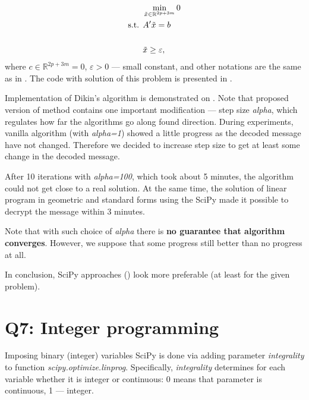 \documentclass{article}
\def\R{\mathbb{R}}
\def\xt{\tilde{x}}
\begin{document}
\begin{equation}\label{eq:dikin_init}
  \begin{aligned}
                 & \min\limits_{\xt \in \R^{2p+3m}} 0 \\
    \text{s.t. } & A' \tilde{x} = b                   \\
    \vspace{20pt}                                     \\
                 & \xt \geq \varepsilon,
  \end{aligned}
  \vspace{20pt}
\end{equation}
where $c \in \mathbb{R}^{2p+3m} = 0 $,
$\varepsilon > 0$ --- small constant,
and other notations are the same as in . The code with solution of this problem is presented in .

Implementation of Dikin's algorithm is demonstrated on . Note that proposed version of method contains one important modification --- step size \textit{alpha}, which regulates how far the algorithms go along found direction.
During experiments, vanilla algorithm (with \textit{alpha=1}) showed a little progress as the decoded message have not changed. Therefore we decided to increase step size to get at least some change in the decoded message.

After 10 iterations with \textit{alpha=100}, which took about 5 minutes, the algorithm could not get close to a real solution. At the same time, the solution of linear program in geometric and standard forms using the SciPy made it possible to decrypt the message within 3 minutes.

Note that with such choice of \textit{alpha} there is \textbf{no guarantee that algorithm converges}. However, we suppose that some progress still better than no progress at all.

In conclusion, SciPy approaches () look more preferable (at least for the given problem).

\section{Q7: Integer programming}
Imposing binary (integer) variables SciPy is done via adding parameter \textit{integrality} to function \textit{scipy.optimize.linprog}. Specifically, \textit{integrality} determines for each variable whether it is integer or continuous: 0 means that parameter is continuous, 1 --- integer.
\end{document}
